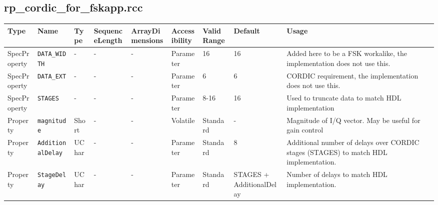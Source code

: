 \documentclass{article}
\def\rcc_comp{rp\_cordic\_for\_fskapp}
\begin{document}
\begin{landscape}
	\subsection*{\rcc_comp.rcc}
	\begin{scriptsize}
		\begin{longtable}{|p{}
                  |p{}
                  |p{}
                  |p{}
                  |p{}
                  |p{}
                  |p{}
                  |p{}
                  |p{}|}
			\hline
			\rowcolor{blue}
			Type         & Name              & Type  & SequenceLength & ArrayDimensions & Accessibility & Valid Range & Default & Usage                                                    \\
			\hline
			SpecProperty & \verb+DATA_WIDTH+ & -     & -              & -               & Parameter     & 16        & 16      & Added here to be a FSK workalike, the implementation does not use this. \\
			\hline
			SpecProperty & \verb+DATA_EXT+   & -     & -              & -               & Parameter     & 6           & 6       & CORDIC requirement, the implementation does not use this. \\
			\hline
			SpecProperty & \verb+STAGES+     & -     & -              & -               & Parameter     & 8-16        & 16      & Used to truncate data to match HDL implementation \\
			\hline
			Property     & \verb+magnitude+  & Short & -              & -               & Volatile      & Standard    & -       & Magnitude of I/Q vector. May be useful for gain control \\
			\hline			
			Property & \verb+AdditionalDelay+     & UChar     & -              & -               & Parameter     & Standard        & 8      & Additional number of delays over CORDIC stages (STAGES) to match HDL implementation.          \\
			\hline
			Property     & \verb+StageDelay+  & UChar & -              & -               & Parameter      & Standard    & STAGES + AdditionalDelay       & Number of delays to match HDL implementation. \\
			\hline


\end{longtable}
\end{scriptsize}
\end{landscape}
\end{document}
